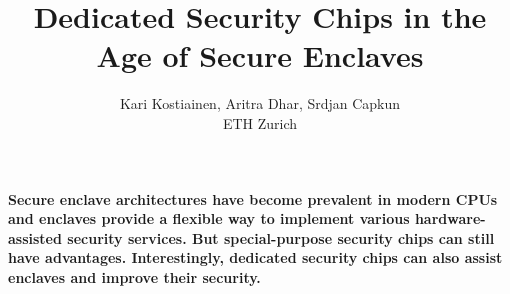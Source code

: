 

\graphicspath{{images/}}

\title{Dedicated Security Chips in the Age of Secure Enclaves} 

\author{Kari Kostiainen, Aritra Dhar, Srdjan Capkun \\ ETH Zurich}


\maketitle
\thispagestyle{empty}

{\bfseries
Secure enclave architectures have become prevalent in modern CPUs and enclaves provide a flexible way to implement various hardware-assisted security services. But special-purpose security chips can still have advantages. Interestingly, dedicated security chips can also assist enclaves and improve their security.}








{\small
%

}
 


